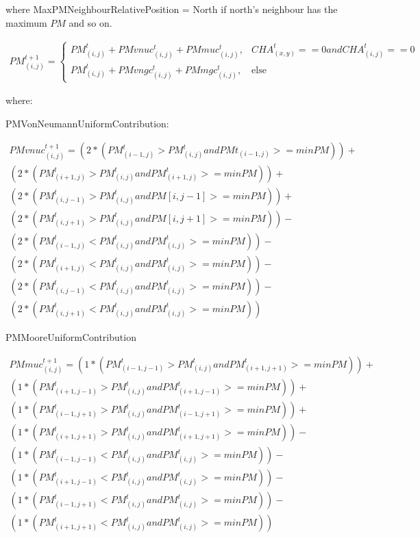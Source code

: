 where MaxPMNeighbourRelativePosition = North if north's neighbour has the maximum $PM$ and so on.

\begin{align*}
PM^{t+1}_{(i, j)}=
\begin{cases} 
PM^t_{(i, j)} + PMvnuc^t_{(i, j)} + PMmuc^t_{(i, j)},& CHA^t_{(x, y)}==0 and CHA^t_{(i, j)}==0 \\ 
PM^t_{(i, j)}  +PMvngc^t_{(i, j)} + PMmgc^t_{(i, j)}, & \mbox{else}
\end{cases}
\end{align*}

where:

PMVonNeumannUniformContribution:

\begin{equation}
\begin{split}
PMvnuc^{t+1}_{(i, j)} = 
(2* (PM^t_{(i-1, j)} > PM^t_{(i, j)} and PMt_{(i-1, j)} >= minPM)) +
\\(2* (PM^t_{(i+1, j)} > PM^t_{(i, j)} and PM^t_{(i+1, j)} >= minPM)) +
\\(2* (PM^t_{(i, j-1)} > PM^t_{(i, j)} and PM[i, j-1] >= minPM)) +
\\(2* (PM^t_{(i, j+1)} > PM^t_{(i, j)} and PM[i, j+1] >= minPM)) -
\\(2*(PM^t_{(i-1, j)} < PM^t_{(i, j)} and PM^t_{(i, j)}>= minPM)) -
\\(2*(PM^t_{(i+1, j)} < PM^t_{(i, j)} and PM^t_{(i, j)} >= minPM)) -
\\(2*(PM^t_{(i, j-1)} < PM^t_{(i, j)} and PM^t_{(i, j)} >= minPM)) -
\\(2*(PM^t_{(i, j+1)} < PM^t_{(i, j)} and PM^t_{(i, j)} >= minPM))
\end{split}
\end{equation}

PMMooreUniformContribution

\begin{equation}
\begin{split}
PMmuc^{t+1}_{(i, j)} = 
(1* (PM^t_{(i-1, j-1)} > PM^t_{(i, j)} and PM^t_{(i+1, j+1)} >= minPM)) +
\\(1* (PM^t_{(i+1, j-1)} > PM^t_{(i, j)} and PM^t_{(i+1, j-1)} >= minPM)) +
\\(1* (PM^t_{(i-1, j+1)} > PM^t_{(i, j)} and PM^t_{(i-1, j+1)}>= minPM)) +
\\(1* (PM^t_{(i+1, j+1)} > PM^t_{(i, j)} and PM^t_{(i+1, j+1)} >= minPM)) -
\\(1*(PM^t_{(i-1, j-1)} < PM^t_{(i, j)} and PM^t_{(i, j)} >= minPM)) -
\\(1*(PM^t_{(i+1, j-1)} < PM^t_{(i, j)} and PM^t_{(i, j)} >= minPM)) -
\\(1*(PM^t_{(i-1, j+1)} < PM^t_{(i, j)} and PM^t_{(i, j)} >= minPM)) -
\\(1*(PM^t_{(i+1, j+1)} < PM^t_{(i, j)} and PM^t_{(i, j)} >= minPM))
\end{split}
\end{equation}

